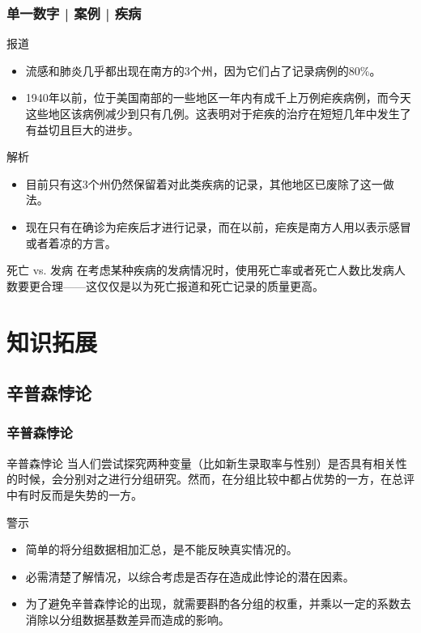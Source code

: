 \begin{frame}
  \frametitle{单一数字 | 案例 | 疾病}
  \begin{block}{报道}
    \begin{itemize}
      \item 流感和肺炎几乎都出现在南方的3个州，因为它们占了记录病例的80\%。
      \item 1940年以前，位于美国南部的一些地区一年内有成千上万例疟疾病例，而今天这些地区该病例减少到只有几例。这表明对于疟疾的治疗在短短几年中发生了有益切且巨大的进步。
    \end{itemize}
  \end{block}
  \pause
  \begin{block}{解析}
    \begin{itemize}
      \item 目前只有这3个州仍然保留着对此类疾病的记录，其他地区已废除了这一做法。
      \item 现在只有在确诊为疟疾后才进行记录，而在以前，疟疾是南方人用以表示感冒或者着凉的方言。
    \end{itemize}
  \end{block}
  \pause
  \begin{block}{死亡 vs. 发病}
    在考虑某种疾病的发病情况时，使用死亡率或者死亡人数比发病人数要更合理——这仅仅是以为死亡报道和死亡记录的质量更高。
  \end{block}
\end{frame}

\section{知识拓展}
\subsection{辛普森悖论}
\begin{frame}
  \frametitle{辛普森悖论}
  \begin{block}{辛普森悖论}
当人们尝试探究两种变量（比如新生录取率与性别）是否具有相关性的时候，会分别对之进行分组研究。然而，在分组比较中都占优势的一方，在总评中有时反而是失势的一方。
  \end{block}
  \pause
  \begin{block}{警示}
    \begin{itemize}
      \item 简单的将分组数据相加汇总，是不能反映真实情况的。
      \item 必需清楚了解情况，以综合考虑是否存在造成此悖论的潜在因素。
      \item 为了避免辛普森悖论的出现，就需要斟酌各分组的权重，并乘以一定的系数去消除以分组数据基数差异而造成的影响。
    \end{itemize}
  \end{block}
\end{frame}

